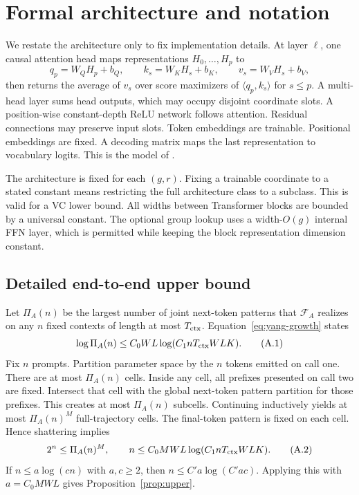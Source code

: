 \appendix

\section{Formal architecture and notation}\label{app:model}

We restate the architecture only to fix implementation details. At layer $\ell$, one causal
attention head maps representations $H_0,\ldots,H_p$ to
\[
 q_p=W_QH_p+b_Q,\qquad k_s=W_KH_s+b_K,\qquad v_s=W_VH_s+b_V,
\]
then returns the average of $v_s$ over score maximizers of $\langle q_p,k_s\rangle$ for
$s\leq p$. A multi-head layer sums head outputs, which may occupy disjoint coordinate slots. A
position-wise constant-depth ReLU network follows attention. Residual connections may preserve
input slots. Token embeddings are trainable. Positional embeddings are fixed. A decoding matrix
maps the last representation to vocabulary logits. This is the model of
\citet[Section~2.1]{yang2026tight}.

The architecture is fixed for each $(g,r)$. Fixing a trainable coordinate to a stated constant means
restricting the full architecture class to a subclass. This is valid for a VC lower bound. All widths
between Transformer blocks are bounded by a universal constant. The optional group lookup uses a
width-$O(g)$ internal FFN layer, which is permitted while keeping the block representation
dimension constant.

\subsection{Detailed end-to-end upper bound}\label{app:upper}

Let $\Pi_A(n)$ be the largest number of joint next-token patterns that $\mathcal F_A$ realizes on
any $n$ fixed contexts of length at most $T_{\rm ctx}$. Equation~\eqref{eq:yang-growth} states
\[
 \log\Pi_A(n)\leq C_0WL\log(C_1nT_{\rm ctx}WLK).
 \tag{A.1}
\]
Fix $n$ prompts. Partition parameter space by the $n$ tokens emitted on call one. There are at most
$\Pi_A(n)$ cells. Inside any cell, all prefixes presented on call two are fixed. Intersect that cell
with the global next-token pattern partition for those prefixes. This creates at most
$\Pi_A(n)$ subcells. Continuing inductively yields at most $\Pi_A(n)^M$ full-trajectory cells.
The final-token pattern is fixed on each cell. Hence shattering implies
\[
 2^n\leq\Pi_A(n)^M,
 \qquad
 n\leq C_0MWL\log(C_1nT_{\rm ctx}WLK).
 \tag{A.2}
\]
If $n\leq a\log(cn)$ with $a,c\geq2$, then $n\leq C'a\log(C'ac)$. Applying this with
$a=C_0MWL$ gives Proposition~\ref{prop:upper}.

